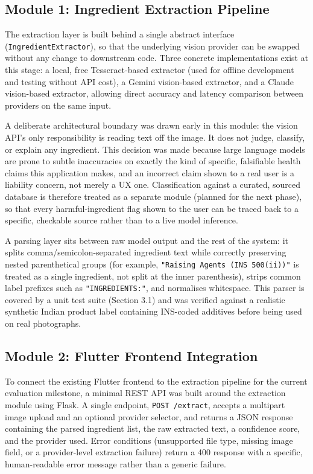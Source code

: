 \documentclass{report}
\begin{document}
\subsection{Module 1: Ingredient Extraction Pipeline}

The extraction layer is built behind a single abstract interface
(\texttt{IngredientExtractor}), so that the underlying vision provider
can be swapped without any change to downstream code. Three concrete
implementations exist at this stage: a local, free Tesseract-based
extractor (used for offline development and testing without API cost), a
Gemini vision-based extractor, and a Claude vision-based extractor,
allowing direct accuracy and latency comparison between providers on the
same input.

A deliberate architectural boundary was drawn early in this module: the
vision API's only responsibility is reading text off the image. It does
not judge, classify, or explain any ingredient. This decision was made
because large language models are prone to subtle inaccuracies on
exactly the kind of specific, falsifiable health claims this application
makes, and an incorrect claim shown to a real user is a liability
concern, not merely a UX one. Classification against a curated,
sourced database is therefore treated as a separate module (planned for
the next phase), so that every harmful-ingredient flag shown to the user
can be traced back to a specific, checkable source rather than to a
live model inference.

A parsing layer sits between raw model output and the rest of the
system: it splits comma/semicolon-separated ingredient text while
correctly preserving nested parenthetical groups (for example,
\texttt{"Raising Agents (INS 500(ii))"} is treated as a single
ingredient, not split at the inner parenthesis), strips common
label prefixes such as \texttt{"INGREDIENTS:"}, and normalises
whitespace. This parser is covered by a unit test suite (Section 3.1)
and was verified against a realistic synthetic Indian product label
containing INS-coded additives before being used on real photographs.

\subsection{Module 2: Flutter Frontend Integration}

To connect the existing Flutter frontend to the extraction pipeline for
the current evaluation milestone, a minimal REST API was built around
the extraction module using Flask. A single endpoint,
\texttt{POST /extract}, accepts a multipart image upload and an optional
provider selector, and returns a JSON response containing the parsed
ingredient list, the raw extracted text, a confidence score, and the
provider used. Error conditions (unsupported file type, missing image
field, or a provider-level extraction failure) return a 400 response
with a specific, human-readable error message rather than a generic
failure.
\end{document}
